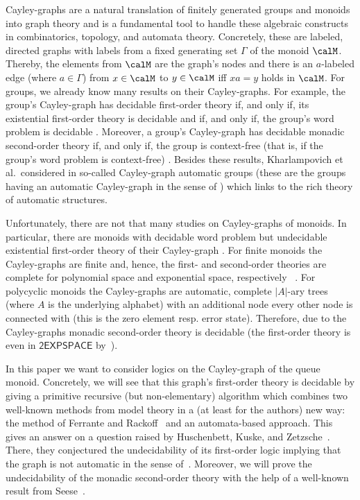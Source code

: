 \documentclass[a4paper,numberwithinsect,USenglish]{lipics-v2018}
\theoremstyle{plain}
\theoremstyle{remark}
\newcommand{\classfont}[1]{\mathsf{#1}}
\begin{document}
	Cayley-graphs are a natural translation of finitely generated groups and monoids into graph theory and is a fundamental tool to handle these algebraic constructs in combinatorics, topology, and automata theory. Concretely, these are labeled, directed graphs with labels from a fixed generating set $\varGamma$ of the monoid $\calM$. Thereby, the elements from $\calM$ are the graph's nodes and there is an $a$-labeled edge (where $a\in\varGamma$) from $x\in\calM$ to $y\in\calM$ iff $xa=y$ holds in $\calM$. For groups, we already know many results on their Cayley-graphs. For example, the group's Cayley-graph has decidable first-order theory if, and only if, its existential first-order theory is decidable and if, and only if, the group's word problem is decidable \cite{KusL05}. Moreover, a group's Cayley-graph has decidable monadic second-order theory if, and only if, the group is context-free (that is, if the group's word problem is context-free) \cite{MulS85,KusL05}. Besides these results, Kharlampovich et al.\ considered in \cite{KKM14} so-called Cayley-graph automatic groups (these are the groups having an automatic Cayley-graph in the sense of \cite{KN95}) which links to the rich theory of automatic structures.
	
	Unfortunately, there are not that many studies on Cayley-graphs of monoids. In particular, there are monoids with decidable word problem but undecidable existential first-order theory of their Cayley-graph \cite{NarO90,KusL06}. For finite monoids the Cayley-graphs are finite and, hence, the first- and second-order theories are complete for polynomial space and exponential space, respectively ~\cite{Graedel03}. For polycyclic monoids the Cayley-graphs are automatic, complete $|A|$-ary trees (where $A$ is the underlying alphabet) with an additional node every other node is connected with (this is the zero element resp. error state). Therefore, due to \cite{DelKT03,KusL06} the Cayley-graphs monadic second-order theory is decidable (the first-order theory is even in $\classfont{2EXPSPACE}$ by~\cite{KusL11}).
	
	In this paper we want to consider logics on the Cayley-graph of the queue monoid. Concretely, we will see that this graph's first-order theory is decidable by giving a primitive recursive (but non-elementary) algorithm which combines two well-known methods from model theory in a (at least for the authors) new way: the method of Ferrante and Rackoff~\cite{FerR79} and an automata-based approach. This gives an answer on a question raised by Huschenbett, Kuske, and Zetzsche~\cite{HusKZ17}. There, they conjectured the undecidability of its first-order logic implying that the graph is not automatic in the sense of~\cite{KN95}. Moreover, we will prove the undecidability of the monadic second-order theory with the help of a well-known result from Seese~\cite{See91}.
	
\end{document}
